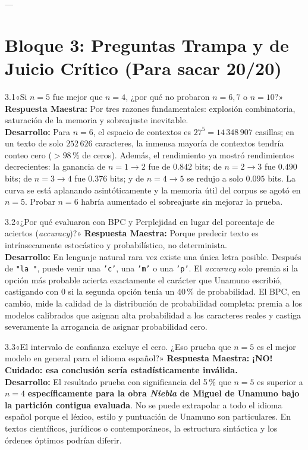 \documentclass[11pt,letterpaper]{article}
\begin{document}
---

\section{Bloque 3: Preguntas Trampa y de Juicio Crítico (Para sacar 20/20)}

\begin{trapbox}{3.1}{«Si $n=5$ fue mejor que $n=4$, ¿por qué no probaron $n=6, 7$ o $n=10$?»}
\textbf{Respuesta Maestra:} Por tres razones fundamentales: explosión combinatoria, saturación de la memoria y sobreajuste inevitable.\\[3pt]
\textbf{Desarrollo:} Para $n=6$, el espacio de contextos es $27^5 = 14\,348\,907$ casillas; en un texto de solo $252\,626$ caracteres, la inmensa mayoría de contextos tendría conteo cero ($> 98$\,\% de ceros). Además, el rendimiento ya mostró rendimientos decrecientes: la ganancia de $n=1 \to 2$ fue de $0.842$ bits; de $n=2 \to 3$ fue $0.490$ bits; de $n=3 \to 4$ fue $0.376$ bits; y de $n=4 \to 5$ se redujo a solo $0.095$ bits. La curva se está aplanando asintóticamente y la memoria útil del corpus se agotó en $n=5$. Probar $n=6$ habría aumentado el sobreajuste sin mejorar la prueba.
\end{trapbox}

\begin{trapbox}{3.2}{«¿Por qué evaluaron con BPC y Perplejidad en lugar del porcentaje de aciertos (\textit{accuracy})?»}
\textbf{Respuesta Maestra:} Porque predecir texto es intrínsecamente estocástico y probabilístico, no determinista.\\[3pt]
\textbf{Desarrollo:} En lenguaje natural rara vez existe una única letra posible. Después de \texttt{"la "}, puede venir una \texttt{'c'}, una \texttt{'m'} o una \texttt{'p'}. El \textit{accuracy} solo premia si la opción más probable acierta exactamente el carácter que Unamuno escribió, castigando con 0 si la segunda opción tenía un 40\,\% de probabilidad. El BPC, en cambio, mide la calidad de la distribución de probabilidad completa: premia a los modelos calibrados que asignan alta probabilidad a los caracteres reales y castiga severamente la arrogancia de asignar probabilidad cero.
\end{trapbox}

\begin{trapbox}{3.3}{«El intervalo de confianza excluye el cero. ¿Eso prueba que $n=5$ es el mejor modelo en general para el idioma español?»}
\textbf{Respuesta Maestra:} \textbf{¡NO! Cuidado: esa conclusión sería estadísticamente inválida.}\\[3pt]
\textbf{Desarrollo:} El resultado prueba con significancia del 5\,\% que $n=5$ es superior a $n=4$ \textbf{específicamente para la obra \textit{Niebla} de Miguel de Unamuno bajo la partición contigua evaluada}. No se puede extrapolar a todo el idioma español porque el léxico, estilo y puntuación de Unamuno son particulares. En textos científicos, jurídicos o contemporáneos, la estructura sintáctica y los órdenes óptimos podrían diferir.
\end{trapbox}
\end{document}
